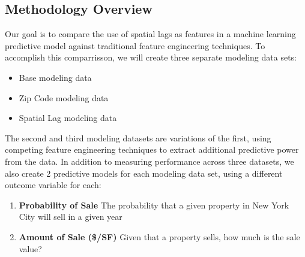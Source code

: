 \documentclass[12pt,]{article}
\providecommand{\tightlist}{%
  \setlength{\itemsep}{0pt}\setlength{\parskip}{0pt}}
\begin{document}
\hypertarget{methodology-overview}{%
\subsection{Methodology Overview}\label{methodology-overview}}

Our goal is to compare the use of spatial lags as features in a machine
learning predictive model against traditional feature engineering
techniques. To accomplish this comparrisson, we will create three
separate modeling data sets:

\begin{itemize}
\tightlist
\item
  Base modeling data
\item
  Zip Code modeling data
\item
  Spatial Lag modeling data
\end{itemize}

\noindent The second and third modeling datasets are variations of the
first, using competing feature engineering techniques to extract
additional predictive power from the data. In addition to measuring
performance across three datasets, we also create 2 predictive models
for each modeling data set, using a different outcome variable for each:

\begin{enumerate}
\def\labelenumi{\arabic{enumi})}
\tightlist
\item
  \textbf{Probability of Sale} The probability that a given property in
  New York City will sell in a given year
\item
  \textbf{Amount of Sale (\$/SF)} Given that a property sells, how much
  is the sale value?
\end{enumerate}

\begin{table}

\caption{\label{tab:model table}\label{tab:modeltable} Six Predictive Models}
\centering
{}
\end{table}
\end{document}
